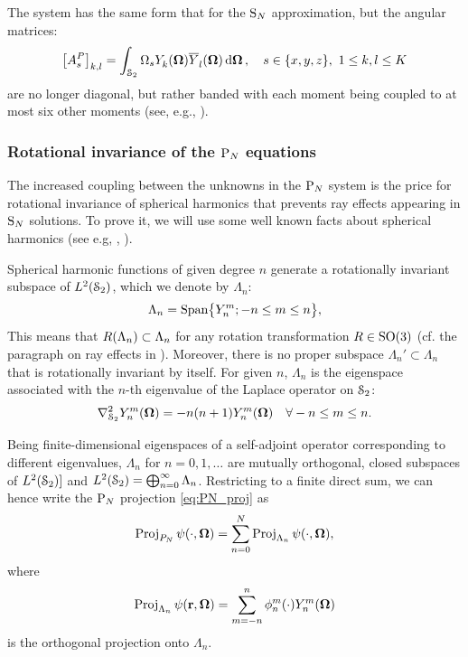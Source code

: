 The system has the same form 
that for the $\SN$ approximation, but the angular matrices:
$$
	\left[A_s^P\right]_{k,l} = \intA{\Omega_s \Y{k}{}(\bomega)\Yc{l}{}(\bomega)},\quad s\in\{x,y,z\},\ 
	1 \leq k,l \leq  K
$$
are no longer diagonal, but rather banded with each moment being coupled to at
most six other moments (see, e.g., \cite{Sanchez8}).


\subsubsection{Rotational invariance of the $\PN$ equations}
The increased coupling between the unknowns in the $\PN$ system is the price for rotational invariance of spherical
harmonics that prevents ray effects appearing in $\SN$ solutions. To prove it, we will use some well known facts about
spherical harmonics (see e.g, \cite[Chap.
3]{Sansone}, \cite[Sec. 3.9]{Schreiner}). 

Spherical harmonic functions of given degree $n$ generate a rotationally invariant subspace
of $\Lp[2](\Sphere)$, which we denote by $\Lambda_n$:
\begin{equation}
	\label{eq:subspace}
    	\Lambda_n = \text{Span}\bigl\{\Y{n}{m}; -n \leq m \leq n\bigr\},
\end{equation}
This means that $\op{R}(\Lambda_n) \subset \Lambda_n$ for any rotation transformation $\op{R}\in\mathrm{SO}(3)$ (cf. the
paragraph on ray effects in \Sref{sec:1-SN}). Moreover, there is no proper subspace $\Lambda_n' \subset \Lambda_n$ that
is rotationally invariant by itself. For given $n$, $\Lambda_n$ is the eigenspace associated with
the $n$-th eigenvalue of the Laplace operator on $\Sphere$:
$$
	\lap_{\Sphere} \Y{n}{m}(\bomega) = -n(n+1)\Y{n}{m}(\bomega) \quad \forall -n \leq m \leq n.
$$

Being finite-dimensional eigenspaces of a self-adjoint operator
corresponding to different eigenvalues, $\Lambda_n$ for $n=0,1,\ldots$ are mutually orthogonal, closed subspaces of
$\Lp[2](\Sphere)]$ and $\Lp[2](\Sphere) = \bigoplus_{n=0}^{\infty}\Lambda_n$\nomenclature[S]{$\bigoplus$}{direct sum of
spaces}.
Restricting to a finite direct sum, we can hence write the $\PN$ projection \eqref{eq:PN_proj} as
\begin{equation}\label{eq:pn_approx2}
	\Projop\psi(\cdot,\bomega) = \suma[n]{0}{N}\Projop[\Lambda_n]\psi(\cdot,\bomega),
\end{equation}
where 
$$
	\Projop[\Lambda_n]\psi(\br,\bomega) = \suma[m]{-n}{n}\angmom{n}{m}(\cdot)\Y{n}{m}(\bomega)
$$
is the orthogonal projection onto $\Lambda_n$.  

